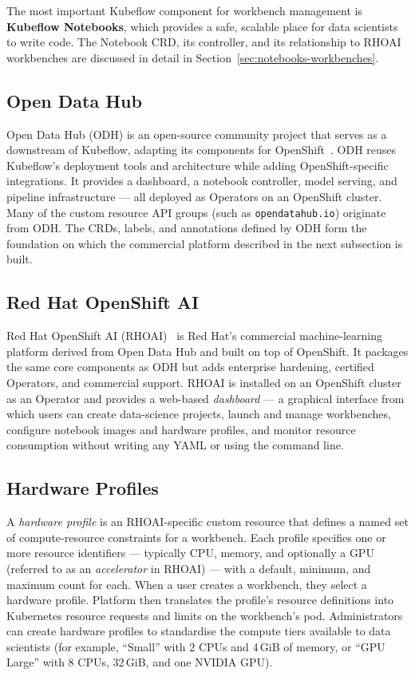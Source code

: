 \documentclass[
  digital,     %
  oneside,     %
  nosansbold,  %
  nocolorbold, %
  lof,         %
  lot,         %
]{fithesis4}
\begin{document}
The most important Kubeflow component for workbench management is
\textbf{Kubeflow Notebooks}, which provides a safe, scalable place for data scientists
to write code. The Notebook CRD, its controller, and its relationship to
RHOAI workbenches are discussed in detail in
Section~\ref{sec:notebooks-workbenches}.

\subsection{Open Data Hub}
\label{subsec:odh}

Open Data Hub (ODH) is an open-source community project that serves as a
downstream of Kubeflow, adapting its components for
OpenShift~\parencite{odh-docs}. ODH reuses Kubeflow's deployment tools and
architecture while adding OpenShift-specific integrations. It provides a
dashboard, a notebook controller, model serving, and pipeline infrastructure
--- all deployed as Operators on an OpenShift cluster. Many of the custom
resource API groups (such as \texttt{opendatahub.io}) originate from ODH.
The CRDs, labels, and annotations defined by ODH form the foundation on which
the commercial platform described in the next subsection is built.

\subsection{Red Hat OpenShift AI}
\label{subsec:rhoai-platform}

Red Hat OpenShift AI (RHOAI)~\parencite{rhoai-docs} is Red Hat's commercial machine-learning platform
derived from Open Data Hub and built on top of
OpenShift. It packages the same core components as ODH
but adds enterprise hardening, certified Operators, and commercial support.
RHOAI is installed on an OpenShift cluster as an Operator and provides a
web-based \emph{dashboard} --- a graphical interface from which users can
create data-science projects, launch and manage workbenches, configure notebook
images and hardware profiles, and monitor resource consumption without writing
any YAML or using the command line.

\subsection{Hardware Profiles}
\label{subsec:hardware-profiles}

A \emph{hardware profile} is an RHOAI-specific custom resource 
that defines a named set of
compute-resource constraints for a workbench. Each profile specifies one or
more resource identifiers --- typically CPU, memory, and optionally a GPU
(referred to as an \emph{accelerator} in RHOAI) --- with
a default, minimum, and maximum count for each. When a user creates a
workbench, they select a hardware profile. Platform then translates the
profile's resource definitions into Kubernetes resource requests and limits on
the workbench's pod. Administrators can create hardware profiles to standardise
the compute tiers available to data scientists (for example, \enquote{Small} with 2
CPUs and 4\,GiB of memory, or \enquote{GPU Large} with 8 CPUs, 32\,GiB, and one
NVIDIA GPU).
\end{document}
